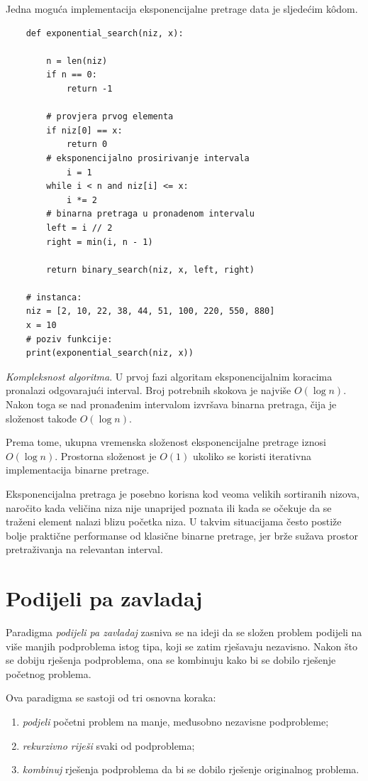 Jedna moguća implementacija eksponencijalne pretrage data je sljedećim k\^odom.

\begin{verbatim}
	def exponential_search(niz, x):
	    
	    n = len(niz)
	    if n == 0:
	        return -1
	
	    # provjera prvog elementa
	    if niz[0] == x:
	        return 0
	    # eksponencijalno prosirivanje intervala
            i = 1
	    while i < n and niz[i] <= x:
	        i *= 2
	    # binarna pretraga u pronadenom intervalu
	    left = i // 2
	    right = min(i, n - 1)
	
	    return binary_search(niz, x, left, right)
	
	# instanca:
	niz = [2, 10, 22, 38, 44, 51, 100, 220, 550, 880]
	x = 10
	# poziv funkcije:
	print(exponential_search(niz, x))
\end{verbatim}

\textit{Kompleksnost algoritma}. U prvoj fazi algoritam eksponencijalnim koracima pronalazi odgovarajući interval. Broj potrebnih skokova je najviše $O(\log n)$. Nakon toga se nad pronađenim intervalom izvršava binarna pretraga, čija je složenost takođe $O(\log n)$.

Prema tome, ukupna vremenska složenost eksponencijalne pretrage iznosi $O(\log n).$ Prostorna složenost je $O(1)$ ukoliko se koristi iterativna implementacija binarne pretrage.

Eksponencijalna pretraga je posebno korisna kod veoma velikih sortiranih nizova, naročito kada veličina niza nije unaprijed poznata ili kada se očekuje da se traženi element nalazi blizu početka niza. U takvim situacijama često postiže bolje praktične performanse od klasične binarne pretrage, jer brže sužava prostor pretraživanja na relevantan interval.


\section{Podijeli pa zavladaj}

Paradigma \textit{podijeli pa zavladaj} zasniva se na ideji da se složen problem podijeli na više manjih podproblema istog tipa, koji se zatim rješavaju nezavisno. Nakon što se dobiju rješenja podproblema, ona se kombinuju kako bi se dobilo rješenje početnog problema.

Ova paradigma se sastoji od tri osnovna koraka:

\begin{enumerate}
	\item \textit{podjeli} početni problem na manje, međusobno nezavisne podprobleme;
	\item \textit{rekurzivno riješi} svaki od podproblema;
	\item \textit{kombinuj} rješenja podproblema da bi se dobilo rješenje originalnog problema.
\end{enumerate}

